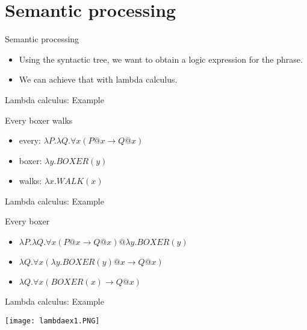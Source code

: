 \documentclass{beamer}
\begin{document}
\section{Semantic processing}
\begin{frame}{Semantic processing}
  \begin{itemize}
  \item {
    Using the syntactic tree, we want to obtain a logic expression for the phrase.
  }
  \item {
    We can achieve that with lambda calculus.
  }
  \end{itemize}
\end{frame}


\begin{frame}{Lambda calculus: Example}
\begin{center}
    Every boxer walks
\end{center}
  \begin{itemize}
      \item {
      every: $\lambda P.\lambda Q.\forall x(P@x\rightarrow Q@x)$
      }
      \item {
      boxer: $\lambda y.BOXER(y)$
      }
      \item {
      walks: $\lambda x.WALK(x)$
      }
  \end{itemize}
\end{frame}

\begin{frame}{Lambda calculus: Example}
  \begin{center}
      Every boxer
  \end{center}
  \begin{itemize}
      \item {
      $\lambda P.\lambda Q.\forall x(P@x\rightarrow Q@x)@\lambda y.BOXER(y)$
      }
      \item {
       $\lambda Q.\forall x(\lambda y.BOXER(y)@x\rightarrow Q@x)$
      }
      \item {
       $\lambda Q.\forall x(BOXER(x)\rightarrow Q@x)$
      }
      
  \end{itemize}

\end{frame}

\begin{frame}{Lambda calculus: Example}
  \begin{center}
  \texttt{[image: lambdaex1.PNG]}
  \end{center}
\end{frame}
\end{document}
